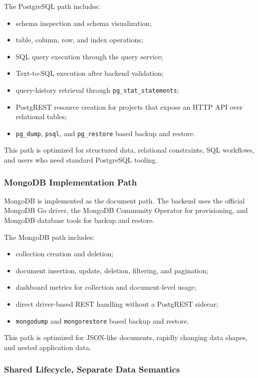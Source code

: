 The PostgreSQL path includes:

\begin{itemize}
    \item schema inspection and schema visualization;
    \item table, column, row, and index operations;
    \item SQL query execution through the query service;
    \item Text-to-SQL execution after backend validation;
    \item query-history retrieval through \texttt{pg\_stat\_statements};
    \item PostgREST resource creation for projects that expose an HTTP API over relational tables;
    \item \texttt{pg\_dump}, \texttt{psql}, and \texttt{pg\_restore} based backup and restore.
\end{itemize}

This path is optimized for structured data, relational constraints, SQL workflows, and users who need standard PostgreSQL tooling.

\subsubsection{MongoDB Implementation Path}

MongoDB is implemented as the document path. The backend uses the official MongoDB Go driver, the MongoDB Community Operator for provisioning, and MongoDB database tools for backup and restore.

The MongoDB path includes:

\begin{itemize}
    \item collection creation and deletion;
    \item document insertion, update, deletion, filtering, and pagination;
    \item dashboard metrics for collection and document-level usage;
    \item direct driver-based REST handling without a PostgREST sidecar;
    \item \texttt{mongodump} and \texttt{mongorestore} based backup and restore.
\end{itemize}

This path is optimized for JSON-like documents, rapidly changing data shapes, and nested application data.

\subsubsection{Shared Lifecycle, Separate Data Semantics}

